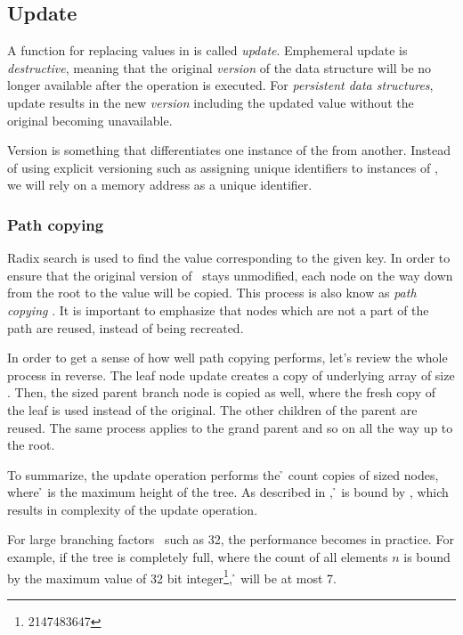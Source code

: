 \subsection{Update}
A function for replacing values in \rbtree{} is called \emph{update}. Emphemeral update is \emph{destructive}, meaning that the original \emph{version} of the data structure will be no longer available after the operation is executed. For \emph{persistent data structures}, update results in the new \emph{version} including the updated value without the original becoming unavailable.

Version is something that differentiates one instance of the \rbtree{} from another. Instead of using explicit versioning such as assigning unique identifiers to instances of \rbtree{}, we will rely on a memory address as a unique identifier.

\subsubsection*{Path copying}
Radix search is used to find the value corresponding to the given key. In order to ensure that the original version of \rbtree\ stays unmodified, each node on the way down from the root to the value will be copied. This process is also know as \emph{path copying} \cite{planar-point-location}. It is important to emphasize that nodes which are not a part of the path are reused, instead of being recreated.

In order to get a sense of how well path copying performs, let’s review the whole process in reverse. The leaf node update creates a copy of underlying array of size \m{}. Then, the \m{} sized parent branch node is copied as well, where the fresh copy of the leaf is used instead of the original. The other children of the parent are reused. The same process applies to the grand parent and so on all the way up to the root.

To summarize, the update operation performs the \h{} count copies of \m{} sized nodes, where \h{} is the maximum height of the tree. As described in , \h{} is bound by , which results in {} complexity of the update operation.

For large branching factors \m\ such as 32, the performance becomes  in practice. For example, if the tree is completely full, where the count of all elements $n$ is bound by the maximum value of 32 bit integer\footnote{2147483647}, \h{} will be at most 7.

